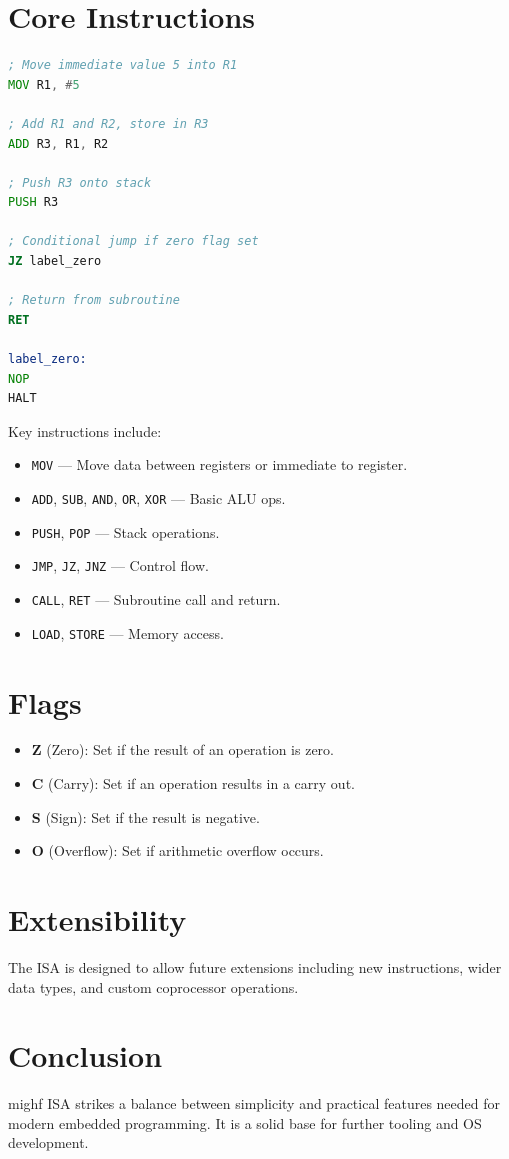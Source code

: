 \documentclass[a4paper,12pt]{article}
\begin{document}
\section{Core Instructions}

\begin{lstlisting}[language=asm,caption={Example mighf assembly code}]
; Move immediate value 5 into R1
MOV R1, #5        

; Add R1 and R2, store in R3
ADD R3, R1, R2   

; Push R3 onto stack
PUSH R3          

; Conditional jump if zero flag set
JZ label_zero     

; Return from subroutine
RET              

label_zero:
NOP               
HALT              
\end{lstlisting}

Key instructions include:
\begin{itemize}
    \item \texttt{MOV} — Move data between registers or immediate to register.
    \item \texttt{ADD}, \texttt{SUB}, \texttt{AND}, \texttt{OR}, \texttt{XOR} — Basic ALU ops.
    \item \texttt{PUSH}, \texttt{POP} — Stack operations.
    \item \texttt{JMP}, \texttt{JZ}, \texttt{JNZ} — Control flow.
    \item \texttt{CALL}, \texttt{RET} — Subroutine call and return.
    \item \texttt{LOAD}, \texttt{STORE} — Memory access.
\end{itemize}

\section{Flags}
\begin{itemize}
    \item \textbf{Z} (Zero): Set if the result of an operation is zero.
    \item \textbf{C} (Carry): Set if an operation results in a carry out.
    \item \textbf{S} (Sign): Set if the result is negative.
    \item \textbf{O} (Overflow): Set if arithmetic overflow occurs.
\end{itemize}

\section{Extensibility}
The ISA is designed to allow future extensions including new instructions, wider data types, and custom coprocessor operations.

\section{Conclusion}
mighf ISA strikes a balance between simplicity and practical features needed for modern embedded programming. It is a solid base for further tooling and OS development.
\end{document}

